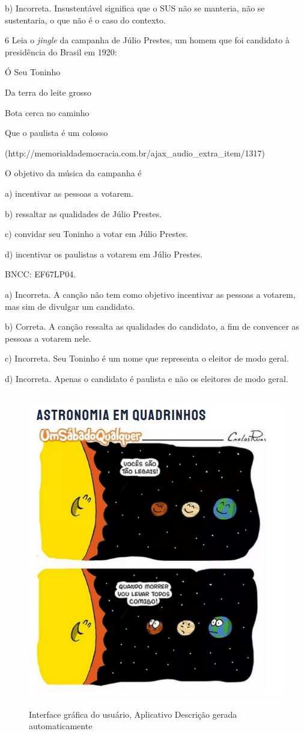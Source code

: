 b) Incorreta. Insustentável significa que o SUS não se manteria, não se
sustentaria, o que não é o caso do contexto.

\num{6} Leia o \emph{jingle} da campanha de Júlio Prestes, um homem que
foi candidato à presidência do Brasil em 1920:

Ó Seu Toninho

Da terra do leite grosso

Bota cerca no caminho

Que o paulista é um colosso

(http://memorialdademocracia.com.br/ajax\_audio\_extra\_item/1317)

O objetivo da música da campanha é

a) incentivar as pessoas a votarem.

b) ressaltar as qualidades de Júlio Prestes.

c) convidar seu Toninho a votar em Júlio Prestes.

d) incentivar os paulistas a votarem em Júlio Prestes.

BNCC: EF67LP04.

a) Incorreta. A canção não tem como objetivo incentivar as pessoas a
votarem, mas sim de divulgar um candidato.

b) Correta. A canção ressalta as qualidades do candidato, a fim de
convencer as pessoas a votarem nele.

c) Incorreta. Seu Toninho é um nome que representa o eleitor de modo
geral.

d) Incorreta. Apenas o candidato é paulista e não os eleitores de modo
geral.

\begin{figure}
\centering
\includegraphics[width=4.75833in,height=5.41291in]{./imgSAEB_6_POR/media/image12.png}
\caption{Interface gráfica do usuário, Aplicativo Descrição gerada
automaticamente}
\end{figure}

